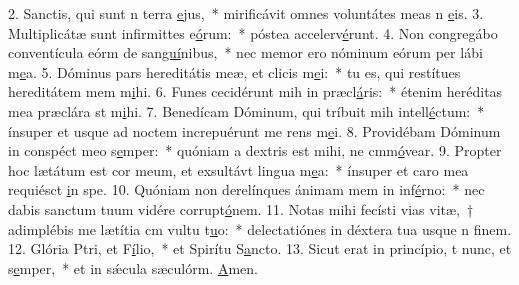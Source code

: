 2. Sanctis, qui sunt n terra \uline{e}jus,~* mirificávit omnes voluntátes meas n \uline{e}is.
3. Multiplicátæ sunt infirmittes e\uline{ó}rum:~* póstea accelerv\uline{é}runt.
4. Non congregábo conventícula eórm de san\uline{guí}nibus,~* nec memor ero nóminum eórum per lábi m\uline{e}a.
5. Dóminus pars hereditátis meæ, et clicis m\uline{e}i:~* tu es, qui restítues hereditátem mem m\uline{i}hi.
6. Funes cecidérunt mih in præcl\uline{á}ris:~* étenim heréditas mea præclára st m\uline{i}hi.
7. Benedícam Dóminum, qui tríbuit mih intell\uline{é}ctum:~* ínsuper et usque ad noctem increpuérunt me rens m\uline{e}i.
8. Providébam Dóminum in conspéct meo s\uline{e}mper:~* quóniam a dextris est mihi, ne cmm\uline{ó}vear.
9. Propter hoc lætátum est cor meum, et exsultávt lingua m\uline{e}a:~* ínsuper et caro mea requiésct \uline{i}n spe.
10. Quóniam non derelínques ánimam mem in inf\uline{é}rno:~* nec dabis sanctum tuum vidére corrupt\uline{ó}nem.
11. Notas mihi fecísti vias vitæ,~† adimplébis me lætítia cm vultu t\uline{u}o:~* delectatiónes in déxtera tua usque n f\uline{i}nem.
12. Glória Ptri, et F\uline{í}lio,~* et Spirítu S\uline{a}ncto.
13. Sicut erat in princípio, t nunc, et s\uline{e}mper,~* et in sǽcula sæculórm. \uline{A}men.
